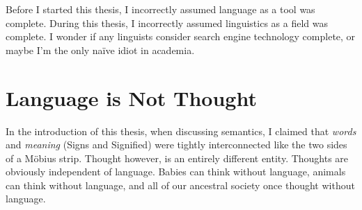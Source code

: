 
Before I started this thesis, I incorrectly assumed language as a tool was complete. During this thesis, I incorrectly assumed linguistics as a field was complete. I wonder if any linguists consider search engine technology complete, or maybe I'm the only na{\"i}ve idiot in academia.










\section{Language is Not Thought}
In the introduction of this thesis, when discussing semantics, I claimed that \textit{words} and \textit{meaning} (Signs and Signified) were tightly interconnected like the two sides of a M{\"o}bius strip. Thought however, is an entirely different entity. Thoughts are obviously independent of language. Babies can think without language, animals can think without language, and all of our ancestral society once thought without language.

